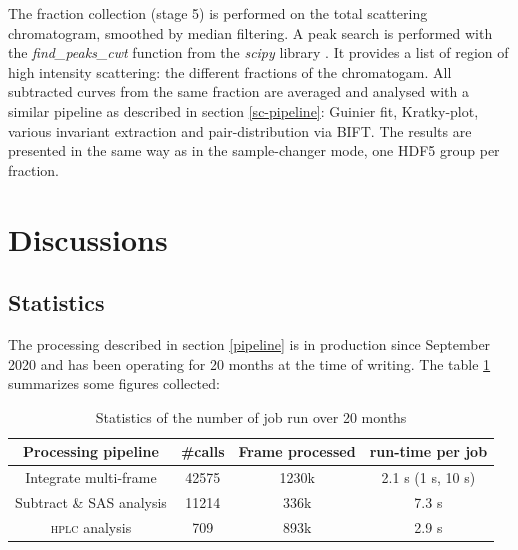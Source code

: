 \documentclass[preprint]{iucr}              %
\begin{document}
The fraction collection (stage 5) is performed on the total scattering chromatogram, smoothed by median filtering. 
A peak search is performed with the \textit{find\_peaks\_cwt} function from the \textit{scipy} library \cite{scipy}.
It provides a list of region of high intensity scattering: the different fractions of the chromatogam.
All subtracted curves from the same fraction are averaged and analysed with a similar pipeline as described in section \ref{sc-pipeline}: Guinier fit, Kratky-plot, various invariant extraction and pair-distribution via BIFT.
The results are presented in the same way as in the sample-changer mode, one HDF5 group per fraction.

\section{Discussions}

\subsection{Statistics}
The processing described in section \ref{pipeline} is in production since September 2020 and has been operating for 20 months at the time of writing.
The table \ref{stats} summarizes some figures collected:
\begin{table}
    \label{stats}
    \caption{Statistics of the number of job run over 20 months}
    \begin{center}
    \begin{tabular}{|c|c|c|c|}
        \hline
        Processing pipeline & \#calls & Frame processed & run-time per job \\
        \hline
        Integrate multi-frame & 42575 & 1230k & 2.1 s (1 s, 10 s) \\
        Subtract \& SAS analysis & 11214 & 336k & 7.3 s \\
        \textsc{hplc} analysis & 709 & 893k & 2.9 s \\
        \hline
    \end{tabular}
    
    \end{center}
\end{table}
\end{document}
